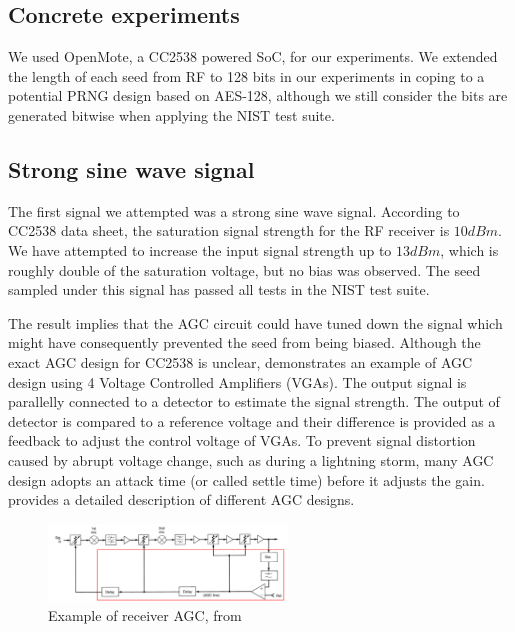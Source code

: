 \subsection{Concrete experiments}
We used OpenMote\cite{OpenMote}, a CC2538 powered SoC, for our experiments. %
We extended the length of each seed from RF  to 128 bits in our experiments in coping to a potential PRNG design based on AES-128, although we still consider the bits are generated bitwise when applying the NIST test suite.

\subsection{Strong sine wave signal} \label{StrongSine}
The first signal we attempted was a strong sine wave signal. According to CC2538 data sheet\cite{CC2538Datasheet}, the saturation signal strength for the RF receiver is $10 dBm$. We have attempted to increase the input signal strength up to $13dBm$, which is roughly double of the saturation voltage, but no bias was observed. The seed sampled under this signal has passed all tests in the NIST test suite.

The result implies that the AGC circuit could have tuned down the signal which might have consequently prevented the seed from being biased. Although the exact AGC design for CC2538 is unclear,  demonstrates an example of AGC design using 4 Voltage Controlled Amplifiers (VGAs). The output signal is parallelly connected to a detector to estimate the signal strength. The output of detector is compared to a reference voltage and their difference is provided as a feedback to adjust the control voltage of VGAs. To prevent signal distortion caused by abrupt voltage change, such as during a lightning storm, many AGC design adopts an attack time (or called settle time) before it adjusts the gain. \cite{AGC} provides a detailed description of different AGC designs. 

\begin{figure}[!t]
\centering
\includegraphics[width=2.5in]{fig/AGC.png}
\caption{Example of receiver AGC, from \cite{AGC_QSL}}
\label{AGC_QSL}
\end{figure}



